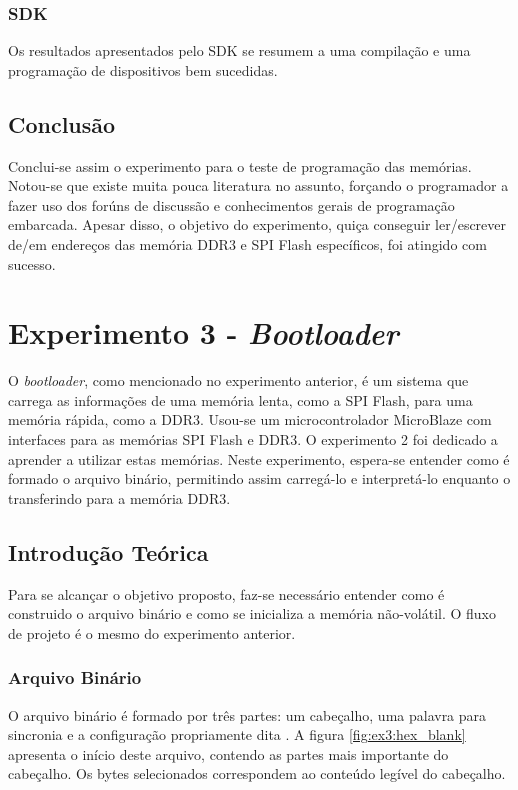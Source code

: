 \documentclass[11pt,a4paper,oneside]{book}
\begin{document}
\subsection{SDK}
Os resultados apresentados pelo SDK se resumem a uma compilação e uma programação de dispositivos bem sucedidas.

\section{Conclusão}
Conclui-se assim o experimento para o teste de programação das memórias.
Notou-se que existe muita pouca literatura no assunto, forçando o programador a fazer uso dos forúns de discussão e conhecimentos gerais de programação embarcada.
Apesar disso, o objetivo do experimento, quiça conseguir ler/escrever de/em endereços das memória DDR3 e SPI Flash específicos, foi atingido com sucesso.


\chapter{Experimento 3 - \textit{Bootloader}}
O \textit{bootloader}, como mencionado no experimento anterior, é um sistema que carrega as informações de uma memória lenta, como a SPI Flash, para uma memória rápida, como a DDR3.
Usou-se um microcontrolador MicroBlaze com interfaces para as memórias SPI Flash e DDR3.
O experimento 2 foi dedicado a aprender a utilizar estas memórias.
Neste experimento, espera-se entender como é formado o arquivo binário, permitindo assim carregá-lo e interpretá-lo enquanto o transferindo para a memória DDR3.

\section{Introdução Teórica}
Para se alcançar o objetivo proposto, faz-se necessário entender como é construido o arquivo binário e como se inicializa a memória não-volátil.
O fluxo de projeto é o mesmo do experimento anterior.

\subsection{Arquivo Binário}
\label{sec:binario}
O arquivo binário é formado por três partes: um cabeçalho, uma palavra para sincronia e a configuração propriamente dita \cite{ug470, xapp583}.
A figura \ref{fig:ex3:hex_blank} apresenta o início deste arquivo, contendo as partes mais importante do cabeçalho.
Os bytes selecionados correspondem ao conteúdo legível do cabeçalho.
\end{document}
